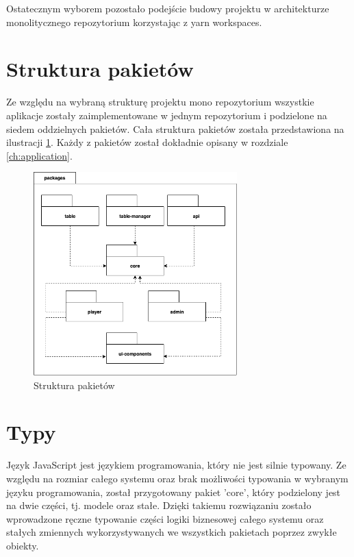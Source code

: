 Ostatecznym wyborem pozostało podejście budowy projektu w architekturze monolitycznego repozytorium korzystając z yarn workspaces.

\newpage

\section{Struktura pakietów}
Ze względu na wybraną strukturę projektu mono repozytorium wszystkie aplikacje zostały zaimplementowane w jednym repozytorium i podzielone na siedem oddzielnych pakietów. Cała struktura pakietów została przedstawiona na ilustracji \ref{fig:packages-structure}. Każdy z pakietów został dokładnie opisany w rozdziale \ref{ch:application}.

\begin{figure}[h!]
  \centering
    \includegraphics[width=0.7\textwidth]{images/diagrams/packages_structure.png}
  \caption{Struktura pakietów}
  \label{fig:packages-structure}
\end{figure}


\section{Typy}
Język JavaScript jest językiem programowania, który nie jest silnie typowany. Ze względu na rozmiar całego systemu oraz brak możliwości typowania w wybranym języku programowania, został przygotowany pakiet 'core', który podzielony jest na dwie części, tj. modele oraz stałe.
Dzięki takiemu rozwiązaniu zostało wprowadzone ręczne typowanie części logiki biznesowej całego systemu oraz stałych zmiennych wykorzystywanych we wszystkich pakietach poprzez zwykłe obiekty. 

